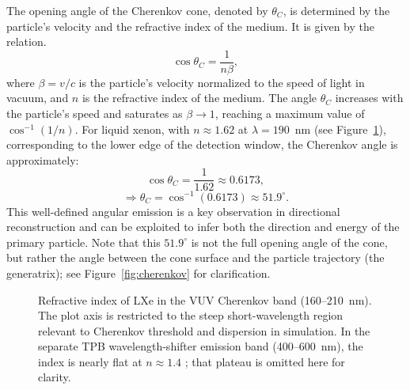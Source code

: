 \documentclass{aastex701}
\begin{document}
The opening angle of the Cherenkov cone, denoted by $\theta_C$, is determined by the particle's velocity and the refractive index of the medium. It is given by the relation.
\[
\cos\theta_C = \frac{1}{n\beta},
\]
where $\beta = v/c$ is the particle's velocity normalized to the speed of light in vacuum, and $n$ is the refractive index of the medium. The angle $\theta_C$ increases with the particle's speed and saturates as $\beta \rightarrow 1$, reaching a maximum value of $\cos^{-1}(1/n)$. For liquid xenon, with $n \approx 1.62$ at $\lambda = 190$~nm (see Figure~\ref{fig:refraction-index}), corresponding to the lower edge of the detection window, the Cherenkov angle is approximately:
\[
\cos \theta_C = \frac{1}{1.62} \approx 0.6173,
\]
\[
\Rightarrow \theta_C = \cos^{-1}(0.6173) \approx 51.9^\circ.
\]
This well-defined angular emission is a key observation in directional reconstruction and can be exploited to infer both the direction and energy of the primary particle. Note that this $51.9^\circ$ is not the full opening angle of the cone, but rather the angle between the cone surface and the particle trajectory (the generatrix); see Figure~\ref{fig:cherenkov} for clarification.
\begin{figure}[htbp]
    \centering
    \caption{Refractive index of LXe in the VUV Cherenkov band (160--210~nm). The plot axis is restricted to the steep short-wavelength region relevant to Cherenkov threshold and dispersion in simulation. In the separate TPB wavelength-shifter emission band (400--600~nm), the index is nearly flat at $n\approx 1.4$ \cite{GomezCadenas2016}; that plateau is omitted here for clarity.}
    \label{fig:refraction-index}
\end{figure}
\end{document}
